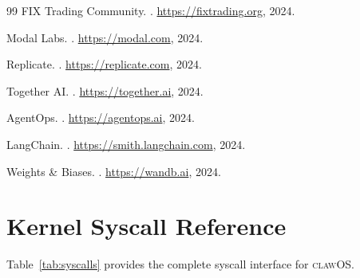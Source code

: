 \documentclass{article}
\newcommand{\clawos}{\textsc{clawOS}}
\begin{document}
\begin{thebibliography}{99}
FIX Trading Community.
.
\newblock \url{https://fixtrading.org}, 2024.

Modal Labs.
.
\newblock \url{https://modal.com}, 2024.

Replicate.
.
\newblock \url{https://replicate.com}, 2024.

Together AI.
.
\newblock \url{https://together.ai}, 2024.

AgentOps.
.
\newblock \url{https://agentops.ai}, 2024.

LangChain.
.
\newblock \url{https://smith.langchain.com}, 2024.

Weights \& Biases.
.
\newblock \url{https://wandb.ai}, 2024.

\end{thebibliography}

%
%

\appendix

\section{Kernel Syscall Reference}
\label{app:syscalls}

Table~\ref{tab:syscalls} provides the complete syscall interface for \clawos{}.
\end{document}
